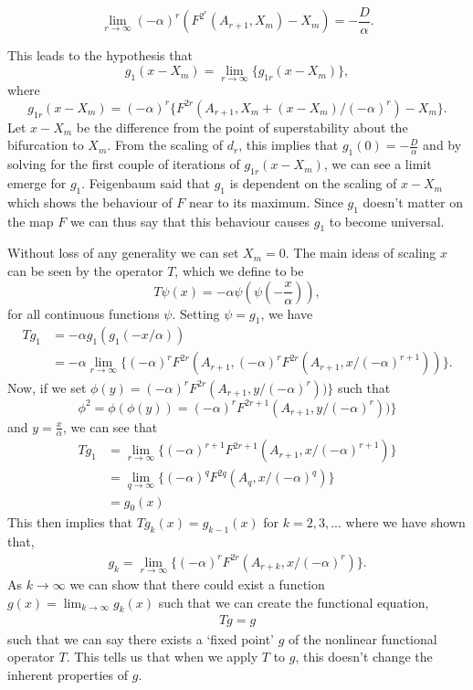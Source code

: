 \begin{equation}
\lim_{r \to \infty} (-\alpha)^r \left(F^{2^r}(A_{r+1}, X_m) - X_m\right) = - \frac{D}{\alpha}.
\end{equation}

This leads to the hypothesis that
$$
g_1(x-X_m)=\lim_{r \to \infty} \{g_{1r}(x-X_m)\},
$$
where
$$
g_{1r}(x-X_m) = (-\alpha)^r \{F^{2r}(A_{r+1}, X_m + (x-X_m)/(-\alpha)^r)-X_m\}.
$$
Let $x-X_m$ be the difference from the point of superstability about the bifurcation to $X_m$. 
From the scaling of $d_r$, this implies that $g_1(0)=-\frac{D}{\alpha}$ and by solving for the first couple of iterations of $g_{1r}(x-X_m)$, we can see a limit emerge for $g_1$.
Feigenbaum said that $g_1$ is dependent on the scaling of $x-X_m$ which shows the behaviour of $F$ near to its maximum. 
Since $g_1$ doesn't matter on the map $F$ we can thus say that this behaviour causes $g_1$ to become universal.

Without loss of any generality we can set $X_m=0$.
The main ideas of scaling $x$ can be seen by the operator $T$, which we define to be
\begin{equation} \label{eq: operator T}
T\psi(x)=-\alpha \psi (\psi(-\frac{x}{\alpha})),
\end{equation}
for all continuous functions $\psi$.
Setting $\psi=g_1$, we have
\begin{align}
    Tg_1 &=-\alpha g_1(g_1(-x/\alpha)) \nonumber \\
    &= -\alpha \lim_{r \to \infty} \{(-\alpha)^rF^{2r}(A_{r+1}, (-\alpha)^rF^{2r}(A_{r+1},x/(-\alpha)^{r+1}))\}.  \label{eq:one}
\end{align}
Now, if we set $\phi(y)=(-\alpha)^rF^{2r}(A_{r+1},y/(-\alpha)^r))\}$ such that $$\phi^2=\phi(\phi(y))=(-\alpha)^rF^{2r+1}(A_{r+1},y/(-\alpha)^r))\}$$ and $y=\frac{x}{\alpha}$, we can see that
\begin{align*}
    Tg_1 &= \lim_{r \to \infty} \{(-\alpha)^{r+1}F^{2r+1}(A_{r+1}, x/(-\alpha)^{r+1})\} \\
    &= \lim_{q \to \infty} \{(-\alpha)^qF^{2q}(A_q,x/(-\alpha)^q)\} \\
    &= g_0(x)
\end{align*}
This then implies that $Tg_k(x)=g_{k-1}(x)$ for $k = 2,3,...$ where we have shown that,
\begin{align}
    g_k=\lim_{r \to \infty} \{(-\alpha)^{r}F^{2r}(A_{r+k}, x/(-\alpha)^{r})\}. \label{eq:two}
\end{align} 
As $k \to \infty$ we can show that there could exist a function $g(x)= \lim_{k \to \infty}g_k(x)$ such that we can create the functional equation,
\begin{align}
    Tg=g \label{eq:FunctionalOperator}
\end{align}
such that we can say there exists a `fixed point' $g$ of the nonlinear functional operator $T$. This tells us that when we apply $T$ to $g$, this doesn't change the inherent properties of $g$. 

